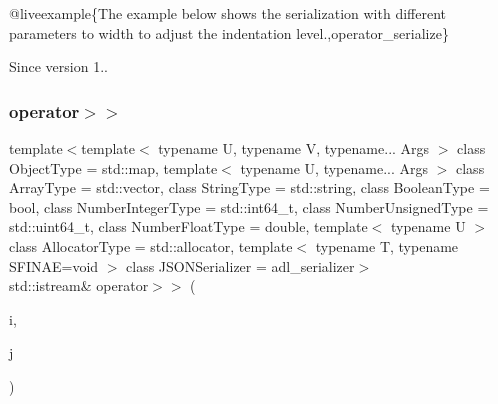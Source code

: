 @liveexample\{The example below shows the serialization with different parameters to {\ttfamily width} to adjust the indentation level.,operator\+\_\+serialize\}

\begin{DoxySince}{Since}
version 1.. 
\end{DoxySince}
\mbox{\label{classnlohmann_1_1basic__json_aaf363408931d76472ded14017e59c9e8}} 
\subsubsection{\texorpdfstring{operator$>$$>$}{operator>>}\hspace{0.1cm}{\footnotesize\ttfamily [2/2]}}
{\footnotesize\ttfamily template$<$template$<$ typename U, typename V, typename... Args $>$ class Object\+Type = std\+::map, template$<$ typename U, typename... Args $>$ class Array\+Type = std\+::vector, class String\+Type  = std\+::string, class Boolean\+Type  = bool, class Number\+Integer\+Type  = std\+::int64\+\_\+t, class Number\+Unsigned\+Type  = std\+::uint64\+\_\+t, class Number\+Float\+Type  = double, template$<$ typename U $>$ class Allocator\+Type = std\+::allocator, template$<$ typename T, typename S\+F\+I\+N\+A\+E=void $>$ class J\+S\+O\+N\+Serializer = adl\+\_\+serializer$>$ \\
std\+::istream\& operator$>$$>$ (\begin{DoxyParamCaption}\item[{std\+::istream \&}]{i,  }\item[{\mbox{\hyperlink{classnlohmann_1_1basic__json}{basic\+\_\+json}}$<$ Object\+Type, Array\+Type, String\+Type, Boolean\+Type, Number\+Integer\+Type, Number\+Unsigned\+Type, Number\+Float\+Type, Allocator\+Type, J\+S\+O\+N\+Serializer $>$ \&}]{j }\end{DoxyParamCaption})\hspace{0.3cm}{\ttfamily [friend]}}



